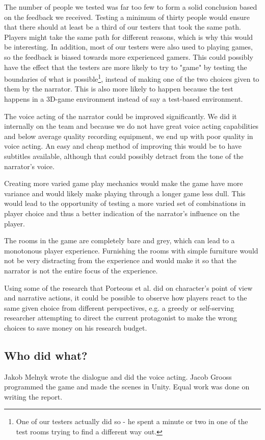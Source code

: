 The number of people we tested was far too few to form a solid conclusion based on the feedback we received. Testing a minimum of thirty people would ensure that there should at least be a third of our testers that took the same path. Players might take the same path for different reasons, which is why this would be interesting. In addition, most of our testers were also used to playing games, so the feedback is biased towards more experienced gamers. This could possibly have the effect that the testers are more likely to try to "game" by testing the boundaries of what is possible\footnote{One of our testers actually did so - he spent a minute or two in one of the test rooms trying to find a different way out.}, instead of making one of the two choices given to them by the narrator. This is also more likely to happen because the test happens in a 3D-game environment instead of say a test-based environment.

The voice acting of the narrator could be improved significantly. We did it internally on the team and because we do not have great voice acting capabilities and below average quality recording equipment, we end up with poor quality in voice acting. An easy and cheap method of improving this would be to have subtitles available, although that could possibly detract from the tone of the narrator's voice.

Creating more varied game play mechanics would make the game have more variance and would likely make playing through a longer game less dull. This would lead to the opportunity of testing a more varied set of combinations in player choice and thus a better indication of the narrator's influence on the player.

The rooms in the game are completely bare and grey, which can lead to a monotonous player experience. Furnishing the rooms with simple furniture would not be very distracting from the experience and would make it so that the narrator is not the entire focus of the experience.

Using some of the research that Porteous et al. \cite{Por} did on character's point of view and narrative actions, it could be possible to observe how players react to the same given choice from different perspectives, e.g. a greedy or self-serving researcher attempting to direct the current protagonist to make the wrong choices to save money on his research budget.

\subsection{Who did what?}
Jakob Melnyk wrote the dialogue and did the voice acting. Jacob Grooss programmed the game and made the scenes in Unity. Equal work was done on writing the report.